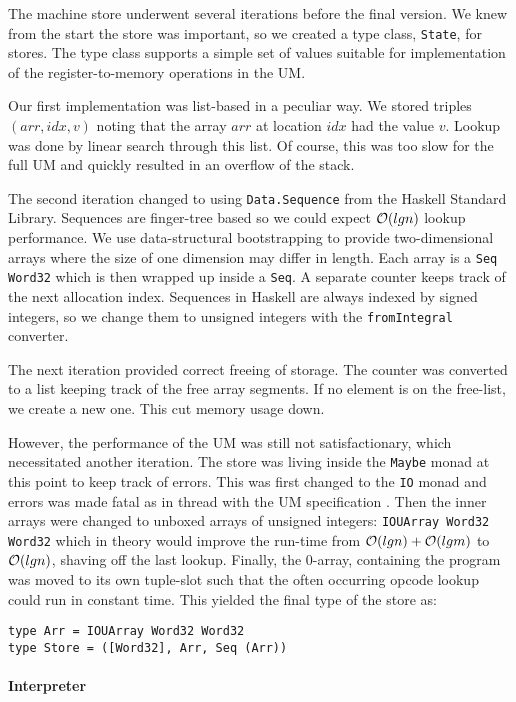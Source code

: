 The machine store underwent several iterations before the final version. We
knew from the start the store was important, so we created a type
class, \texttt{State}, for stores. The type class supports a simple
set of values suitable for implementation of the register-to-memory
operations in the UM.

Our first implementation was list-based in a peculiar way. We stored
triples $(arr, idx, v)$ noting that the array $arr$ at location $idx$
had the value $v$. Lookup was done by linear search through this
list.  Of course, this was too slow for the
full UM and quickly resulted in an overflow of the stack.

The second iteration changed to using \texttt{Data.Sequence} from the
Haskell Standard Library. Sequences are finger-tree based so we could
expect $\mathcal{O}(lg n)$ lookup performance. We use data-structural
bootstrapping \cite{okasaki+pfds} to provide two-dimensional arrays
where the size of one dimension may differ in length. Each array is a
\texttt{Seq Word32} which is then wrapped up inside a \texttt{Seq}. A
separate counter keeps track of the next allocation index. Sequences
in Haskell are always indexed by signed integers, so we change them to
unsigned integers with the \texttt{fromIntegral} converter.

The next iteration provided correct freeing of storage. The counter
was converted to a list keeping track of the free array segments. If
no element is on the free-list, we create a new one. This cut memory
usage down.

However, the performance of the UM was still not satisfactionary, which
necessitated another iteration. The store was living inside the \texttt{Maybe}
monad at this point to keep track of errors. This was first changed to the
\texttt{IO} monad and errors was made fatal as in thread with the UM
specification \cite{um+spec}. Then the inner arrays were changed to
unboxed arrays of unsigned integers: \texttt{IOUArray Word32 Word32}
which in theory would improve the run-time from $\mathcal{O}(lg n) + \mathcal{O}(lg
  m)$ to $\mathcal{O}(lg n)$, shaving off the last lookup. Finally, the
$0$-array, containing the program was moved to its own tuple-slot such
that the often occurring opcode lookup could run in constant
time. This yielded the final type of the store as:
\begin{verbatim}
type Arr = IOUArray Word32 Word32
type Store = ([Word32], Arr, Seq (Arr))
\end{verbatim}

\paragraph{Interpreter}
\label{sec:interpreter}

